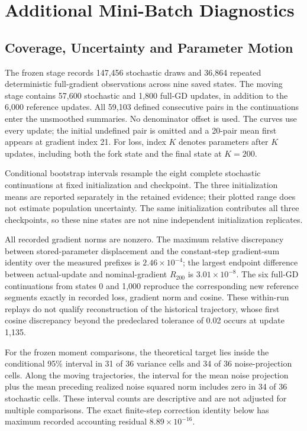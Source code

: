 \section{Additional Mini-Batch Diagnostics}
\label{appendix:sgd-noise-diagnostics}

\subsection{Coverage, Uncertainty and Parameter Motion}

The frozen stage records 147,456 stochastic draws and 36,864 repeated
deterministic full-gradient observations across nine saved states.
The moving stage contains 57,600 stochastic and 1,800 full-GD updates,
in addition to the 6,000 reference updates. All 59,103 defined consecutive
pairs in the continuations enter the unsmoothed summaries. No denominator
offset is used. The curves use every update; the initial undefined pair
is omitted and a 20-pair mean first appears at gradient index 21.
For loss, index $K$ denotes parameters after $K$ updates, including
both the fork state and the final state at $K=200$.

Conditional bootstrap intervals resample the eight complete stochastic
continuations at fixed initialization and checkpoint. The three
initialization means are reported separately in the retained evidence;
their plotted range does not estimate population uncertainty. The same
initialization contributes all three checkpoints, so these nine states
are not nine independent initialization replicates.

All recorded gradient norms are nonzero. The maximum relative discrepancy
between stored-parameter displacement and the constant-step gradient-sum
identity over the measured prefixes is $2.46\times10^{-4}$; the largest
endpoint difference between actual-update and nominal-gradient $R_{200}$
is $3.01\times10^{-8}$. The six full-GD continuations from states 0 and
1,000 reproduce the corresponding new reference segments exactly in
recorded loss, gradient norm and cosine. These within-run replays do not
qualify reconstruction of the historical trajectory, whose first cosine
discrepancy beyond the predeclared tolerance of 0.02 occurs at update 1,135.

For the frozen moment comparisons, the theoretical target lies inside
the conditional 95\% interval in 31 of 36 variance cells and 34 of 36
noise-projection cells. Along the moving trajectories, the interval for
the mean noise projection plus the mean preceding realized noise squared
norm includes zero in 34 of 36 stochastic cells. These interval counts
are descriptive and are not adjusted for multiple comparisons. The exact
finite-step correction identity below has maximum recorded accounting
residual $8.89\times10^{-16}$.

